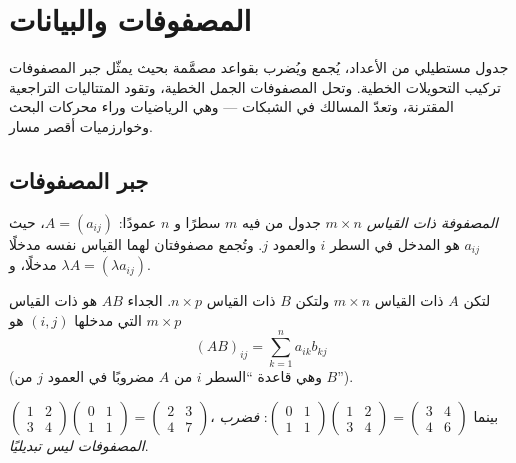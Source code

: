 \chapter{المصفوفات والبيانات}\label{ch:g12:matrix}

 جدول مستطيلي من الأعداد، يُجمع ويُضرب بقواعد
مصمَّمة بحيث يمثّل جبر المصفوفات تركيب التحويلات
الخطية. وتحل المصفوفات الجمل الخطية، وتقود المتتاليات التراجعية
المقترنة، وتعدّ المسالك في الشبكات --- وهي الرياضيات وراء
محركات البحث وخوارزميات أقصر مسار.

\section{جبر المصفوفات}

\begin{definition}[المصفوفة]\label{def:g12:matrix:matrix}
\emph{المصفوفة ذات القياس $m \times n$} جدول من  فيه
$m$ سطرًا و $n$ عمودًا:
$A = (a_{ij})$، حيث $a_{ij}$ هو المدخل في السطر $i$ والعمود $j$.
وتُجمع مصفوفتان لهما القياس نفسه مدخلًا مدخلًا، و
$\lambda A = (\lambda a_{ij})$.
\end{definition}

\begin{definition}\label{def:g12:matrix:product}
لتكن $A$ ذات القياس $m \times n$ ولتكن $B$ ذات القياس $n \times p$. الجداء $AB$ هو
 ذات القياس $m \times p$ التي مدخلها $(i,j)$ هو
\[
(AB)_{ij} = \sum_{k=1}^{n} a_{ik} b_{kj}
\]
(وهي قاعدة ``السطر $i$ من $A$ مضروبًا في العمود $j$ من $B$'').
\end{definition}

\begin{example}
$\begin{pmatrix} 1 & 2\\ 3 & 4\end{pmatrix}
\begin{pmatrix} 0 & 1\\ 1 & 1\end{pmatrix}
= \begin{pmatrix} 2 & 3\\ 4 & 7\end{pmatrix}$،
\quad بينما \quad
$\begin{pmatrix} 0 & 1\\ 1 & 1\end{pmatrix}
\begin{pmatrix} 1 & 2\\ 3 & 4\end{pmatrix}
= \begin{pmatrix} 3 & 4\\ 4 & 6\end{pmatrix}$:
\emph{فضرب المصفوفات ليس تبديليًا}.
\end{example}


